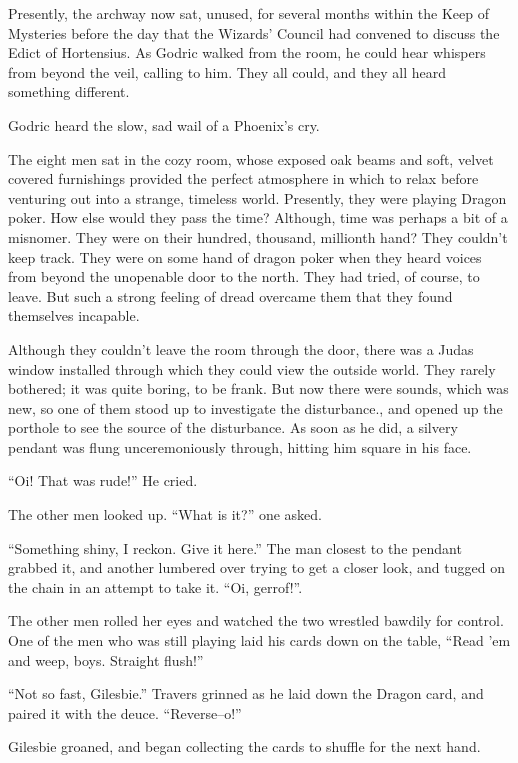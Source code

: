 Presently, the archway now sat, unused, for several months within the Keep of Mysteries before the day that the Wizards’ Council had convened to discuss the Edict of Hortensius. As Godric walked from the room, he could hear whispers from beyond the veil, calling to him. They all could, and they all heard something different.

Godric heard the slow, sad wail of a Phoenix’s cry.
\simpleline	


The eight men sat in the cozy room, whose exposed oak beams and soft, velvet covered furnishings provided the perfect atmosphere in which to relax before venturing out into a strange, timeless world. Presently, they were playing Dragon poker. How else would they pass the time? Although, time was perhaps a bit of a misnomer. They were on their hundred, thousand, millionth hand? They couldn’t keep track. They were on some hand of dragon poker when they heard voices from beyond the unopenable door to the north. They had tried, of course, to leave. But such a strong feeling of dread overcame them that they found themselves incapable.

Although they couldn’t leave the room through the door, there was a Judas window installed through which they could view the outside world. They rarely bothered; it was quite boring, to be frank. But now there were sounds, which was new, so one of them stood up to investigate the disturbance., and opened up the porthole to see the source of the disturbance. As soon as he did, a silvery pendant was flung unceremoniously through, hitting him square in his face.

“Oi! That was rude!” He cried.

The other men looked up. “What is it?” one asked.

“Something shiny, I reckon. Give it here.” The man closest to the pendant grabbed it, and another lumbered over trying to get a closer look, and tugged on the chain in an attempt to take it. “Oi, gerrof!”.

The other men rolled her eyes and watched the two wrestled bawdily for control. One of the men who was still playing laid his cards down on the table, “Read ’em and weep, boys. Straight flush!”

“Not so fast, Gilesbie.” Travers grinned as he laid down the Dragon card, and paired it with the deuce. “Reverse\mbox{--}o!”

Gilesbie groaned, and began collecting the cards to shuffle for the next hand.
\simpleline

